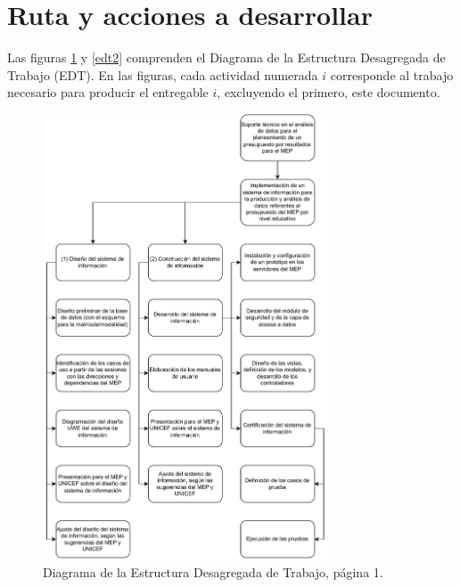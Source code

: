 \documentclass[a4paper, 9pt, conference]{article}              %
\theoremstyle{definition}
\begin{document}
\section{Ruta y acciones a desarrollar}

Las figuras \ref{edt1} y \ref{edt2} comprenden el Diagrama de la Estructura Desagregada de Trabajo (EDT). En las figuras, cada actividad numerada $i$ corresponde al trabajo necesario para producir el entregable $i$, excluyendo el primero, este documento.

\begin{figure}
	\centering
		\includegraphics[width=320px, keepaspectratio=false]{edt1}
			\caption{Diagrama de la Estructura Desagregada de Trabajo, p\'agina 1.}
	\label{edt1}
\end{figure}
\end{document}
